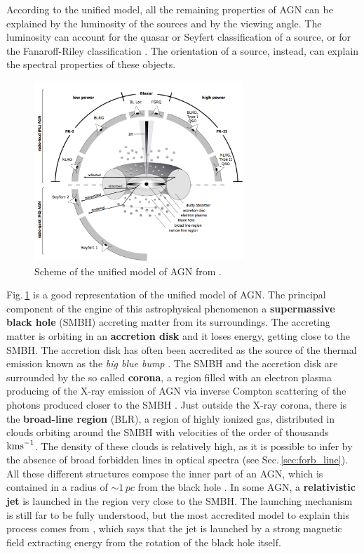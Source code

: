 \documentclass[../main.tex]{subfiles}
\begin{document}
According to the unified model, all the remaining properties of AGN can be explained by the luminosity of the sources and by the viewing angle.
The luminosity can account for the quasar or Seyfert classification of a source, or for the Fanaroff-Riley classification \citep{Fanaroff74}.
The orientation of a source, instead, can explain the spectral properties of these objects.

\begin{figure}
\centering
\includegraphics[width=0.7\textwidth]{PhD_thesis/images/AGNmodel.png} 
\caption[]{Scheme of the unified model of AGN from \citet{Beckmann12}. }
\label{fig:unified_model}
\end{figure}

Fig.\,\ref{fig:unified_model} is a good representation of the unified model of AGN.
The principal component of the engine of this astrophysical phenomenon a \textbf{supermassive black hole} (SMBH) accreting matter from its surroundings.
The accreting matter is orbiting in an \textbf{accretion disk} and it loses energy, getting close to the SMBH.
The accretion disk has often been accredited as the source of the thermal emission known as the \emph{big blue bump} \citep[e.g.][]{Shang05}.
The SMBH and the accretion disk are surrounded by the so called \textbf{corona}, a region filled with an electron plasma producing of the X-ray emission of AGN via inverse Compton scattering of the photons produced closer to the SMBH \citep{Haardt91}.
Just outside the X-ray corona, there is the \textbf{broad-line region} (BLR), a region of highly ionized gas, distributed in clouds orbiting around the SMBH with velocities of the order of thousands $\si{\kms}$. 
The density of these clouds is relatively high, as it is possible to infer by the absence of broad forbidden lines in optical spectra (see Sec.\,\ref{sec:forb_line}).
All these different structures compose the inner part of an AGN, which is contained in a radius of $\sim 1\,\si{pc}$ from the black hole \citep{Beckmann12}.
In some AGN, a \textbf{relativistic jet} is launched in the region very close to the SMBH. 
The launching mechanism is still far to be fully understood, but the most accredited model to explain this process comes from \citet{Blandford77}, which says that the jet is launched by a strong magnetic field extracting energy from the rotation of the black hole itself.
\end{document}
